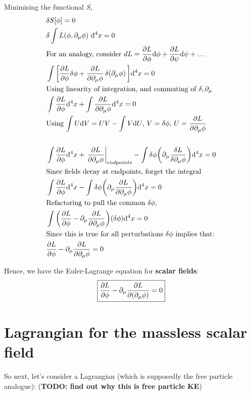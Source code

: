 Minimising the functional $S$,
\begin{align*}
    &\delta S[\phi] = 0 \\
    & \delta \int L(\phi, \partial_\mu \phi)~\dd^4x = 0 \\
    &\text{For an analogy, consider $dL = \pdv{L}{\phi} \dd \phi + \pdv{L}{\psi} \dd \psi + \dots$} \\
    & \int \bigg[\pdv{L}{\phi} \var \phi +
    \pdv{L}{\partial_\mu \phi} \var (\partial_\mu \phi) \bigg] \dd^4 x  = 0\\
    &\text{Using linearity of integration, and commuting of $\delta, \partial_\mu$}\\
    & \int \pdv{L}{\phi} (\var \phi) \dd^4 x +
      \int \pdv{L}{\partial_\mu \phi}  (\partial_\mu \var \phi) \dd^4 x = 0 \\
    &\text{Using $\int U \dd V = UV - \int V \dd U$,
        $V = \delta \phi$,
    $U = \pdv{L}{\partial_\mu \phi}$ } \\
    \\
    & \int \pdv{L}{\phi} (\var \phi) \dd^4 x +
       \eval{\pdv{L}{\partial_\mu \phi}  (\var \phi)}_{endpoints}
      -  \int \delta \phi \bigg(\partial_\mu \fdv{L}{\partial_\mu \phi} \bigg) \dd^4 x  = 0\\
  &\text{Since fields decay at endpoints, forget the integral} \\
  & \int \pdv{L}{\phi} (\var \phi) \dd^4 x
  -  \int \delta \phi \bigg(\partial_\mu \pdv{L}{\partial_\mu \phi} \bigg) \dd^4 x = 0\\
  &\text{Refactoring to pull the common $\delta \phi$,}\\
  & \int \bigg(\pdv{L}{\phi} -  \partial_\mu \pdv{L}{\partial_\mu \phi} \bigg) (\var \phi) \dd^4 x  = 0 \\
  & \text{Since this is true for all perturbations $\delta \phi$ implies that:} \\
  &\pdv{L}{\phi} -  \partial_\mu \pdv{L}{\partial_\mu \phi} = 0
\end{align*}


Hence, we have the Euler-Lagrange equation for \textbf{scalar fields}:
\begin{equation}
    \boxed{\pdv{L}{\phi} -  \partial_\mu \pdv{L}{(\partial_\mu \phi)} = 0}
\end{equation}

\section{Lagrangian for the massless scalar field}
So next, let's consider a Lagrangian (which is supposedly the free particle
analogue):
(\textbf{TODO: find out why this is free particle KE})


